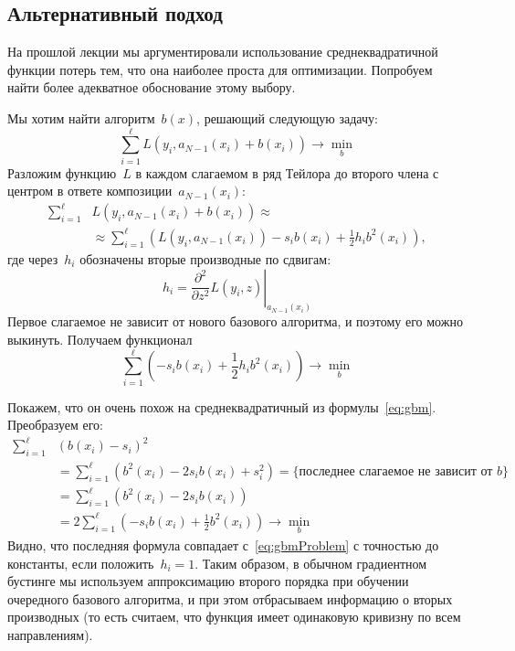 \documentclass[12pt,fleqn]{article}
\begin{document}
\subsection{Альтернативный подход}
На прошлой лекции мы аргументировали использование среднеквадратичной функции потерь тем,
что она наиболее проста для оптимизации.
Попробуем найти более адекватное обоснование этому выбору.

Мы хотим найти алгоритм~$b(x)$, решающий следующую задачу:
\[
    \sum_{i = 1}^{\ell}
        L(y_i, a_{N - 1}(x_i) + b(x_i))
    \to
    \min_{b}
\]
Разложим функцию~$L$ в каждом слагаемом в ряд Тейлора до второго члена
с центром в ответе композиции~$a_{N - 1}(x_i)$:
\begin{align*}
    \sum_{i = 1}^{\ell}&
        L(y_i, a_{N - 1}(x_i) + b(x_i))
    \approx\\
    &\approx
    \sum_{i = 1}^{\ell} \left(
        L(y_i, a_{N - 1}(x_i))
        -
        s_i b(x_i)
        +
        \frac12
        h_i b^2(x_i)
    \right),
\end{align*}
где через~$h_i$ обозначены вторые производные по сдвигам:
\[
    h_i
    =
    \left.
    \frac{\partial^2}{\partial z^2}
    L(y_i, z)
    \right|_{a_{N - 1}(x_i)}
\]
Первое слагаемое не зависит от нового базового алгоритма, и поэтому его можно выкинуть.
Получаем функционал
\begin{equation}\label{eq:gbmProblem}
    \sum_{i = 1}^{\ell} \left(
        -
        s_i b(x_i)
        +
        \frac12
        h_i b^2(x_i)
    \right)
    \to
    \min_{b}
\end{equation}

Покажем, что он очень похож на среднеквадратичный из формулы~\eqref{eq:gbm}.
Преобразуем его:
\begin{align*}
    \sum_{i = 1}^{\ell}&
        \left(
            b(x_i) - s_i
        \right)^2\\
    &=
    \sum_{i = 1}^{\ell} \left(
        b^2(x_i)
        -
        2 s_i b(x_i)
        +
        s_i^2
    \right) = \{\text{последнее слагаемое не зависит от $b$}\} \\
    &=
    \sum_{i = 1}^{\ell} \left(
        b^2(x_i)
        -
        2 s_i b(x_i)
    \right)\\
    &=
    2
    \sum_{i = 1}^{\ell}
    \left(
        -
        s_i
        b(x_i)
        +
        \frac12
        b^2(x_i)
    \right)
    \to
    \min_{b}
\end{align*}
Видно, что последняя формула совпадает с~\eqref{eq:gbmProblem}
с точностью до константы, если положить~$h_i = 1$.
Таким образом, в обычном градиентном бустинге мы используем
аппроксимацию второго порядка при обучении очередного базового алгоритма,
и при этом отбрасываем информацию о вторых производных (то есть считаем,
что функция имеет одинаковую кривизну по всем направлениям).
\end{document}
